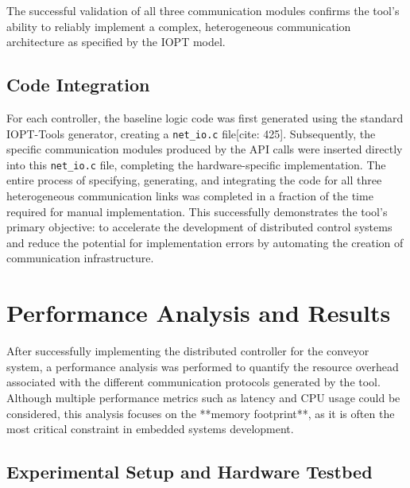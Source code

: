 The successful validation of all three communication modules confirms the tool's ability to reliably implement a complex, heterogeneous communication architecture as specified by the IOPT model.


\subsection{Code Integration}
For each controller, the baseline logic code was first generated using the standard IOPT-Tools generator, creating a \texttt{net\_io.c} file[cite: 425]. Subsequently, the specific communication modules produced by the API calls were inserted directly into this \texttt{net\_io.c} file, completing the hardware-specific implementation. The entire process of specifying, generating, and integrating the code for all three heterogeneous communication links was completed in a fraction of the time required for manual implementation. This successfully demonstrates the tool's primary objective: to accelerate the development of distributed control systems and reduce the potential for implementation errors by automating the creation of communication infrastructure.
\section{Performance Analysis and Results}
\label{sec:performance_analysis}

After successfully implementing the distributed controller for the conveyor system, a performance analysis was performed to quantify the resource overhead associated with the different communication protocols generated by the tool. Although multiple performance metrics such as latency and CPU usage could be considered, this analysis focuses on the **memory footprint**, as it is often the most critical constraint in embedded systems development.


\subsection{Experimental Setup and Hardware Testbed}
\label{subsec:hardware_setup}

